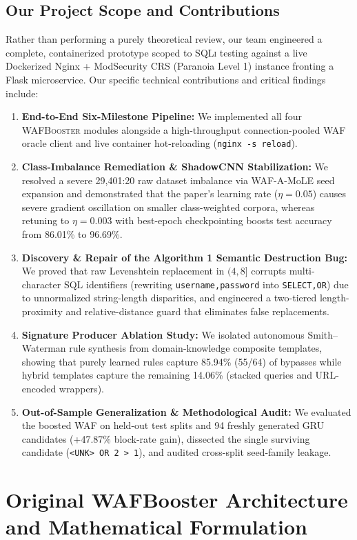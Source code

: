 \documentclass[conference]{IEEEtran}
\newcommand{\WAF}{\textsc{WAF}}
\newcommand{\WAFB}{\textsc{WAFBooster}}
\newcommand{\SQLi}{\textsc{SQLi}}
\begin{document}
\subsection{Our Project Scope and Contributions}
Rather than performing a purely theoretical review, our team engineered a complete, containerized prototype scoped to \SQLi{} testing against a live Dockerized Nginx + ModSecurity CRS (Paranoia Level 1) instance fronting a Flask microservice. Our specific technical contributions and critical findings include:
\begin{enumerate}
    \item \textbf{End-to-End Six-Milestone Pipeline:} We implemented all four \WAFB{} modules alongside a high-throughput connection-pooled \WAF{} oracle client and live container hot-reloading (\texttt{nginx -s reload}).
    \item \textbf{Class-Imbalance Remediation \& ShadowCNN Stabilization:} We resolved a severe 29,401:20 raw dataset imbalance via WAF-A-MoLE seed expansion and demonstrated that the paper's learning rate ($\eta=0.05$) causes severe gradient oscillation on smaller class-weighted corpora, whereas retuning to $\eta=0.003$ with best-epoch checkpointing boosts test accuracy from 86.01\% to 96.69\%.
    \item \textbf{Discovery \& Repair of the Algorithm 1 Semantic Destruction Bug:} We proved that raw Levenshtein replacement in $(4,8]$ corrupts multi-character SQL identifiers (rewriting \texttt{username,password} into \texttt{SELECT,OR}) due to unnormalized string-length disparities, and engineered a two-tiered length-proximity and relative-distance guard that eliminates false replacements.
    \item \textbf{Signature Producer Ablation Study:} We isolated autonomous Smith--Waterman rule synthesis from domain-knowledge composite templates, showing that purely learned rules capture 85.94\% (55/64) of bypasses while hybrid templates capture the remaining 14.06\% (stacked queries and URL-encoded wrappers).
    \item \textbf{Out-of-Sample Generalization \& Methodological Audit:} We evaluated the boosted \WAF{} on held-out test splits and 94 freshly generated GRU candidates (+47.87\% block-rate gain), dissected the single surviving candidate (\texttt{<UNK> OR 2 > 1}), and audited cross-split seed-family leakage.
\end{enumerate}

\section{Original WAFBooster Architecture and Mathematical Formulation}
\end{document}
